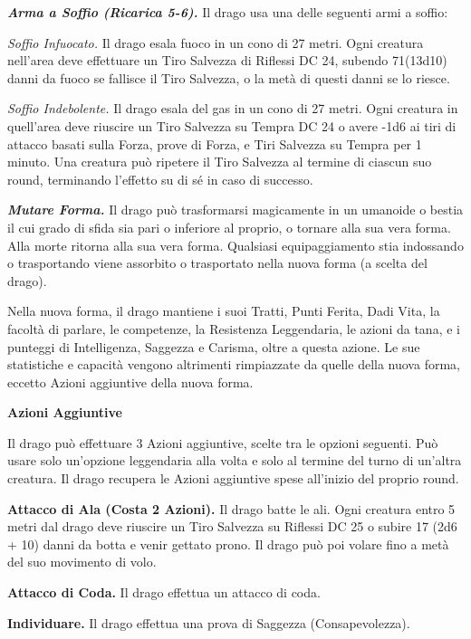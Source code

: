 \begin{multicols}{2}
	\textit{\textbf{Arma a Soffio (Ricarica 5-6).}} Il drago usa una delle seguenti armi a soffio:

	\textit{Soffio Infuocato.} Il drago esala fuoco in un cono di 27 metri. Ogni creatura nell'area deve effettuare un Tiro Salvezza di Riflessi DC 24, subendo 71(13d10) danni da fuoco se fallisce il Tiro Salvezza, o la metà di questi danni se lo riesce.

	\textit{Soffio Indebolente.} Il drago esala del gas in un cono di 27 metri. Ogni creatura in quell'area deve riuscire un Tiro Salvezza su Tempra DC 24 o avere -1d6 ai tiri di attacco basati sulla Forza, prove di Forza, e Tiri Salvezza su Tempra per 1 minuto. Una creatura può ripetere il Tiro Salvezza al termine di ciascun suo round, terminando l'effetto su di sé in caso di successo.

	\textit{\textbf{Mutare Forma.}} Il drago può trasformarsi magicamente in un umanoide o bestia il cui grado di sfida sia pari o inferiore al proprio, o tornare alla sua vera forma. Alla morte ritorna alla sua vera forma. Qualsiasi equipaggiamento stia indossando o trasportando viene assorbito o trasportato nella nuova forma (a scelta del drago).

	Nella nuova forma, il drago mantiene i suoi Tratti, Punti Ferita, Dadi Vita, la facoltà di parlare, le competenze, la Resistenza Leggendaria, le azioni da tana, e i punteggi di Intelligenza, Saggezza e Carisma, oltre a questa azione. Le sue statistiche e capacità vengono altrimenti rimpiazzate da quelle della nuova forma, eccetto Azioni aggiuntive della nuova forma.

	\textbf{Azioni Aggiuntive}

	Il drago può effettuare 3 Azioni aggiuntive, scelte tra le opzioni seguenti. Può usare solo un'opzione leggendaria alla volta e solo al termine del turno di un'altra creatura. Il drago recupera le Azioni aggiuntive spese all'inizio del proprio round.

	\textbf{Attacco di Ala (Costa 2 Azioni).} Il drago batte le ali. Ogni creatura entro 5 metri dal drago deve riuscire un Tiro Salvezza su Riflessi DC 25 o subire 17 (2d6 + 10) danni da botta e venir gettato prono. Il drago può poi volare fino a metà del suo movimento di volo.

	\textbf{Attacco di Coda.} Il drago effettua un attacco di coda.

	\textbf{Individuare.} Il drago effettua una prova di Saggezza (Consapevolezza).


\end{multicols}
